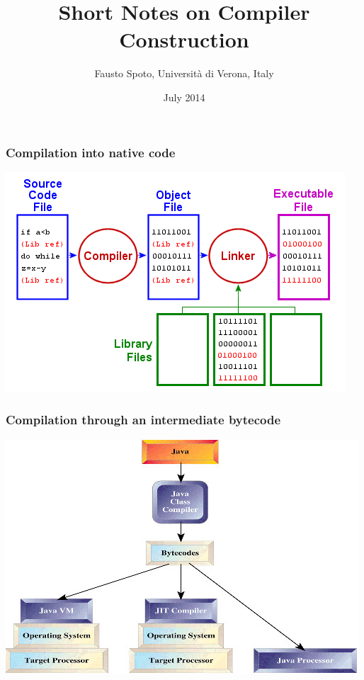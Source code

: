 \documentclass[11pt]{beamer}  %
\title{Short Notes on Compiler Construction}
\author{Fausto Spoto, Universit\`a di Verona, Italy}
\date{July 2014}
\begin{document}
\frame{\titlepage}

\begin{frame}
\frametitle{Compilation into native code}

\begin{center}
\includegraphics[scale=0.6]{pictures/c_compiler.jpg}
\end{center}

\end{frame}

\begin{frame}
\frametitle{Compilation through an intermediate bytecode}

\begin{center}
\includegraphics[scale=0.6]{pictures/java_compiler.jpg}
\end{center}

\end{frame}
\end{document}
